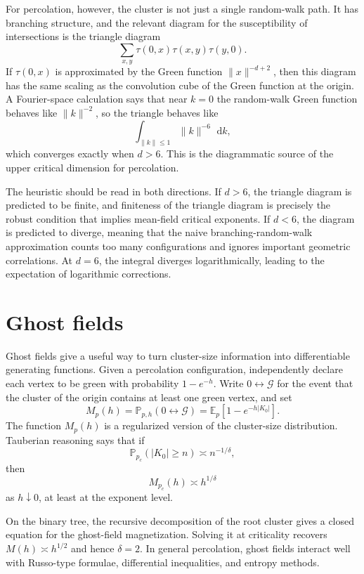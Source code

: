 \documentclass[11pt,reqno]{book}
\numberwithin{equation}{chapter}
\theoremstyle{plain}
\theoremstyle{definition}
\theoremstyle{remark}
\renewcommand{\P}{\mathbb P}
\newcommand{\E}{\mathbb E}
\newcommand{\1}{\mathbf 1}
\newcommand{\norm}[1]{\lVert #1\rVert}
\newcommand{\dd}{\,\mathrm d}
\newcommand{\as}{\asymp}
\begin{document}
For percolation, however, the cluster is not just a single random-walk path. It has branching structure, and the relevant diagram for the susceptibility of intersections is the triangle diagram
\[
  \sum_{x,y}\tau(0,x)\tau(x,y)\tau(y,0).
\]
If $\tau(0,x)$ is approximated by the Green function $\norm{x}^{-d+2}$, then this diagram has the same scaling as the convolution cube of the Green function at the origin. A Fourier-space calculation says that near $k=0$ the random-walk Green function behaves like $\norm{k}^{-2}$, so the triangle behaves like
\[
  \int_{\norm{k}\leq 1}\norm{k}^{-6}\,\dd k,
\]
which converges exactly when $d>6$. This is the diagrammatic source of the upper critical dimension for percolation.

The heuristic should be read in both directions. If $d>6$, the triangle diagram is predicted to be finite, and finiteness of the triangle diagram is precisely the robust condition that implies mean-field critical exponents. If $d<6$, the diagram is predicted to diverge, meaning that the naive branching-random-walk approximation counts too many configurations and ignores important geometric correlations. At $d=6$, the integral diverges logarithmically, leading to the expectation of logarithmic corrections.

\section{Ghost fields}

Ghost fields give a useful way to turn cluster-size information into differentiable generating functions. Given a percolation configuration, independently declare each vertex to be green with probability $1-e^{-h}$. Write $0\leftrightarrow \mathcal G$ for the event that the cluster of the origin contains at least one green vertex, and set
\[
  M_p(h)=\P_{p,h}(0\leftrightarrow \mathcal G)
  =\E_p\left[1-e^{-h|K_0|}\right].
\]
The function $M_p(h)$ is a regularized version of the cluster-size distribution. Tauberian reasoning says that if
\[
  \P_{p_c}(|K_0|\geq n)\as n^{-1/\delta},
\]
then
\[
  M_{p_c}(h)\as h^{1/\delta}
\]
as $h\downarrow 0$, at least at the exponent level.

On the binary tree, the recursive decomposition of the root cluster gives a closed equation for the ghost-field magnetization. Solving it at criticality recovers $M(h)\as h^{1/2}$ and hence $\delta=2$. In general percolation, ghost fields interact well with Russo-type formulae, differential inequalities, and entropy methods.
\end{document}
